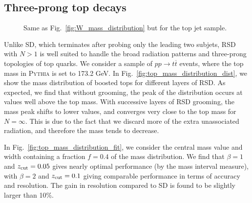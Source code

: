 \documentclass[11pt,a4paper]{article}
\newcommand{\pythia}[1]{\textsc{Pythia\xspace #1}}
\DeclareRobustCommand{\Fig}[1]{Fig.~\ref{#1}}
\begin{document}
\subsection{Three-prong top decays}
\label{sec:top_mass}



\begin{figure}[t]
  \centering
  \qquad
  \caption{ Same as \Fig{fig:W_mass_distribution} but for the top jet sample.}
  \label{fig:top_mass_distribution}
\end{figure}

Unlike SD, which terminates after probing only the leading two subjets, RSD with $N > 1$ is well suited to handle the broad radiation patterns and three-prong topologies of top quarks.
%
We consider a sample of $pp \rightarrow t\overline{t}$ events, where the top mass in \pythia{} is set to 173.2 GeV.
%
In \Fig{fig:top_mass_distribution_dist}, we show the mass distribution of boosted tops for different layers of RSD.
%
As expected, we find that without grooming, the peak of the
distribution occurs at values well above the top mass.
%
With successive layers of RSD grooming, the mass peak shifts to
lower values, and converges very close
to the top mass for $N=\infty$.
%
This is due to the fact that we discard more of the extra
unassociated radiation, and therefore the mass tends to decrease.

In \Fig{fig:top_mass_distribution_fit}, we consider the central mass value and width containing a fraction $f=0.4$ of the mass distribution.
%
We find that $\beta=1$ and $z_{\rm{cut}} =0.05$ gives nearly optimal
performance (by the mass interval measure), with $\beta=2$ and
$z_{\rm{cut}} =0.1$ giving comparable performance in terms of accuracy
and resolution.
%
The gain in resolution compared to SD is found to be slightly larger
than 10\%.
\end{document}
